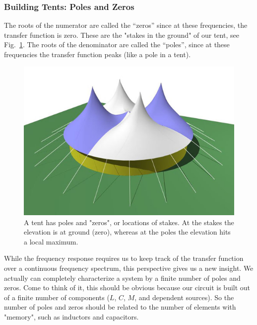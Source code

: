 \subsubsection{Building Tents: Poles and Zeros}
The roots of the numerator are called the “zeros” since at these frequencies, the transfer function is zero.  These are the "stakes in the ground" of our tent, see Fig.~\ref{fig:tent}.  	The roots of the denominator are called the “poles”, since at these frequencies the transfer function peaks (like a pole in a tent).
\begin{figure}[tb]
\begin{center}
\includegraphics[angle=-0.0,width=.8\columnwidth]{image_11.jpg}
\end{center}
\caption{A tent has poles and "zeros", or locations of stakes.  At the stakes the elevation is at ground (zero), whereas at the poles the elevation hits a local maximum.}
\label{fig:tent}
\end{figure}
While the frequency response requires us to keep track of the transfer function over a continuous frequency spectrum, this perspective gives us a new insight.  We actually can completely characterize a system by a finite number of poles and zeros.  Come to think of it, this should be obvious because our circuit is built out of a finite number of components ($L$, $C$, $M$, and dependent sources).  So the number of poles and zeros should be related to the number of elements with "memory", such as inductors and capacitors.  
